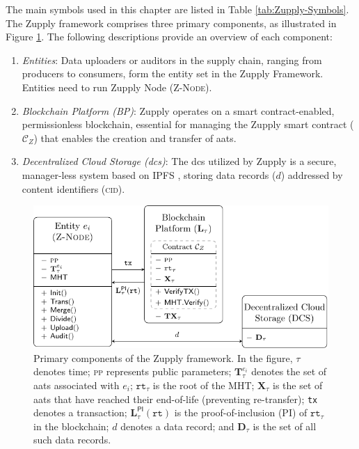 The main symbols used in this chapter are listed in Table \ref{tab:Zupply-Symbols}. 
The Zupply framework comprises three primary components, as illustrated in Figure \ref{fig:Zupply-Architecture}. The following descriptions provide an overview of each component:

\begin{enumerate}
    \item \textit{Entities}: Data uploaders or auditors in the supply chain, ranging from producers to consumers, form the entity set in the Zupply Framework. Entities need to run Zupply Node (\textsc{Z-Node}).  %

    \item \textit{Blockchain Platform (BP)}: Zupply operates on a smart contract-enabled, permissionless blockchain, essential for managing the Zupply smart contract ($\mathcal{C}_Z$) that enables the creation and transfer of \gls{aat}s. 

    \item \textit{Decentralized Cloud Storage (\gls{dcs})}: The \gls{dcs} utilized by Zupply is a secure, manager-less system based on IPFS \cite{ipfs}, storing data records ($d$) addressed by content identifiers (\textsc{cid}). 
    
\end{enumerate}

\begin{figure}
    \centering
    \includegraphics[width=0.8\linewidth]{Figures/Architecture}
    \caption[Primary components of the Zupply framework]{Primary components of the Zupply framework. In the figure, $\tau$ denotes time; \textsc{pp} represents public parameters; $\mathbf{T}_\tau^{e_i}$ denotes the set of \gls{aat}s associated with $e_i$; $\texttt{rt}_\tau$ is the root of the \textsf{MHT}; $\mathbf{X}_\tau$ is the set of \gls{aat}s that have reached their end-of-life (preventing re-transfer); \texttt{tx} denotes a transaction; $\mathbf{L}_\tau^\mathsf{PI}(\texttt{rt})$ is the proof-of-inclusion (PI) of $\texttt{rt}_\tau$ in the blockchain; $d$ denotes a data record; and $\mathbf{D}_\tau$ is the set of all such data records.}
    \label{fig:Zupply-Architecture}
\end{figure}

